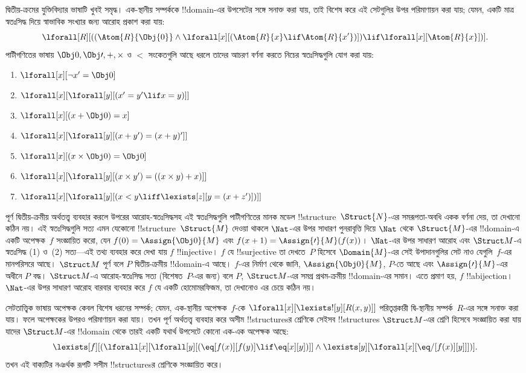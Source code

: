 \documentclass[../../../include/open-logic-section]{subfiles}
\begin{document}
দ্বিতীয়-ক্রমের যুক্তিবিদ্যার ভাষাটি খুবই সমৃদ্ধ। এক-স্থানীয় সম্পর্ককে
!!{domain}-এর উপসেটের সঙ্গে সনাক্ত করা যায়, তাই বিশেষ করে এই সেটগুলির
উপর পরিমাণায়ন করা যায়; যেমন, একটি মাত্র স্বতঃসিদ্ধ দিয়ে স্বাভাবিক
সংখ্যার জন্য আরোহ প্রকাশ করা যায়:
\[
\lforall[R][((\Atom{R}{\Obj{0}} \land \lforall[x][(\Atom{R}{x} \lif
    \Atom{R}{x'})]) \lif \lforall[x][\Atom{R}{x}])].
\]
পাটীগণিতের ভাষায় $\Obj 0, \Obj \prime, +, \times$ ও $<$ সংকেতগুলি
আছে ধরলে তাদের আচরণ বর্ণনা করতে নিচের স্বতঃসিদ্ধগুলি যোগ করা যায়:
\begin{enumerate}
\item $\lforall[x][\lnot x' = \Obj 0]$
\item $\lforall[x][\lforall[y][(x' = y' \lif x = y)]]$
\item $\lforall[x][(x + \Obj 0) = x]$
\item $\lforall[x][\lforall[y][(x + y') = (x + y)']]$
\item $\lforall[x][(x \times \Obj 0) = \Obj 0]$
\item $\lforall[x][\lforall[y][(x \times y') = ((x \times y) + x)]]$
\item $\lforall[x][\lforall[y][(x < y \liff \lexists[z][y = (x + z')])]]$
\end{enumerate}

পূর্ণ দ্বিতীয়-ক্রমীয় অর্থতত্ত্ব ব্যবহার করলে উপরের আরোহ-স্বতঃসিদ্ধসহ
এই স্বতঃসিদ্ধগুলি পাটীগণিতের মানক মডেল !!{structure}~$\Struct{N}$-এর
সমরূপতা-অবধি একক বর্ণনা দেয়, তা দেখানো কঠিন নয়। এই স্বতঃসিদ্ধগুলি
সত্য এমন যেকোনো !!{structure}~$\Struct{M}$ দেওয়া থাকলে $\Nat$-এর উপর
সাধারণ পুনরাবৃত্তি দিয়ে $\Nat$ থেকে $\Struct{M}$-এর !!{domain}-এ
একটি অপেক্ষক~$f$ সংজ্ঞায়িত করো, যেন $f(0) = \Assign{\Obj 0}{M}$ এবং
$f(x+1) = \Assign{\prime}{M}(f(x))$। $\Nat$-এর উপর সাধারণ আরোহ এবং
$\Struct M$-এ স্বতঃসিদ্ধ (1) ও~(2) সত্য---এই তথ্য ব্যবহার করে দেখা যায়
$f$ !!{injective}। $f$ যে !!{surjective} তা দেখতে~$P$ হিসেবে
$\Domain{M}$-এর সেই উপাদানগুলির সেট নাও যেগুলি~$f$-এর মানপরিসরে আছে।
$\Struct M$ পূর্ণ বলে $P$ দ্বিতীয়-ক্রমীয় !!{domain}-এ আছে। $f$-এর
নির্মাণ থেকে জানি, $\Assign{\Obj 0}{M}$, $P$-তে আছে এবং
$\Assign{\prime}{M}$-এর অধীনে $P$ বদ্ধ। $\Struct M$-এ
আরোহ-স্বতঃসিদ্ধ সত্য (বিশেষত~$P$-এর জন্য) বলে $P$, $\Struct M$-এর
সমগ্র প্রথম-ক্রমীয় !!{domain}-এর সমান। এতে প্রমাণ হয়, $f$
!!a{bijection}। $\Nat$-এর উপর সাধারণ আরোহ বারবার ব্যবহার করে $f$ যে
একটি হোমোমরফিজম, তা দেখানোও এর চেয়ে কঠিন নয়।

সেটতাত্ত্বিক ভাষায় অপেক্ষক কেবল বিশেষ ধরনের সম্পর্ক; যেমন, এক-স্থানীয়
অপেক্ষক~$f$-কে $\lforall[x][\lexists![y][R(x,y)]]$ পরিতৃপ্তকারী
দ্বি-স্থানীয় সম্পর্ক~$R$-এর সঙ্গে সনাক্ত করা যায়। ফলে অপেক্ষকের উপরও
পরিমাণায়ন করা যায়। তখন পূর্ণ অর্থতত্ত্ব ব্যবহার করে অসীম
!!{structure}sর শ্রেণিকে সেইসব !!{structure}s $\Struct M$-এর শ্রেণি
হিসেবে সংজ্ঞায়িত করা যায় যাদের $\Struct M$-এর !!{domain} থেকে তারই একটি যথার্থ
উপসেটে কোনো এক-এক অপেক্ষক আছে:
\[
\lexists[f][(\lforall[x][\lforall[y][(\eq[f(x)][f(y)] \lif \eq[x][y])]]
  \land \lexists[y][\lforall[x][\eq/[f(x)][y]]])].
\]
তখন এই বাক্যটির নঞর্থক রূপটি সসীম !!{structure}sর শ্রেণিকে
সংজ্ঞায়িত করে।
\end{document}
